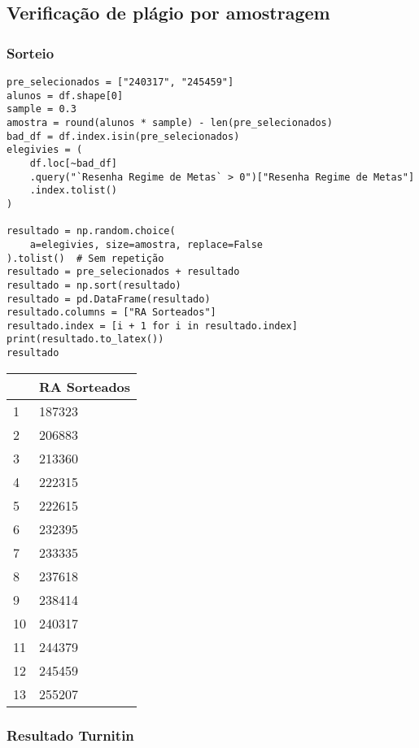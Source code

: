 \documentclass[11pt]{article}
\begin{document}
\subsection{Verificação de plágio por amostragem}
\label{sec:orgb590596}
\subsubsection{Sorteio}
\label{sec:org4ac4a54}

\begin{verbatim}
pre_selecionados = ["240317", "245459"]
alunos = df.shape[0]
sample = 0.3
amostra = round(alunos * sample) - len(pre_selecionados)
bad_df = df.index.isin(pre_selecionados)
elegivies = (
    df.loc[~bad_df]
    .query("`Resenha Regime de Metas` > 0")["Resenha Regime de Metas"]
    .index.tolist()
)

resultado = np.random.choice(
    a=elegivies, size=amostra, replace=False
).tolist()  # Sem repetição
resultado = pre_selecionados + resultado
resultado = np.sort(resultado)
resultado = pd.DataFrame(resultado)
resultado.columns = ["RA Sorteados"]
resultado.index = [i + 1 for i in resultado.index]
print(resultado.to_latex())
resultado
\end{verbatim}

\begin{tabular}{ll}
\toprule
{} & RA Sorteados \\
\midrule
1  &       187323 \\
2  &       206883 \\
3  &       213360 \\
4  &       222315 \\
5  &       222615 \\
6  &       232395 \\
7  &       233335 \\
8  &       237618 \\
9  &       238414 \\
10 &       240317 \\
11 &       244379 \\
12 &       245459 \\
13 &       255207 \\
\bottomrule
\end{tabular}


\subsubsection{Resultado Turnitin}
\label{sec:orge067d7e}
\end{document}
